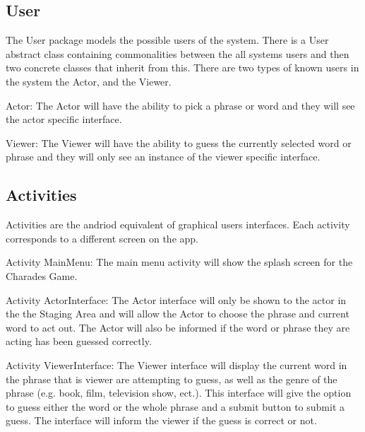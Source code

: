 \documentclass{article}
\begin{document}
\subsection{User}
The User package models the possible users of the system. There is a User abstract class containing commonalities between the all systems users and then two concrete classes that inherit from this. There are two types of known users in the system the Actor, and the Viewer. 

Actor: The Actor will have the ability to pick a phrase or word and they will see the actor specific interface.

Viewer: The Viewer will have the ability to guess the currently selected word or phrase and they will only see an  instance of the viewer specific interface.

\subsection{Activities}
Activities are the andriod equivalent of graphical users interfaces. Each activity corresponds to a different screen on the app.

Activity MainMenu: The main menu activity will show the splash screen for the Charades Game.

Activity ActorInterface: The Actor interface will only be shown to the actor in the the Staging Area and will allow the Actor to choose the phrase and current word to act out. The Actor will also be informed if the word or phrase they are acting has been guessed correctly.

Activity ViewerInterface: The Viewer interface will display the current word in the phrase that is viewer are attempting to guess, as well as the genre of the phrase (e.g. book, film, television show, ect.). This interface will give the option to guess either the word or the whole phrase and a submit button to submit a guess. The interface will inform the viewer if the guess is correct or not.
\end{document}
